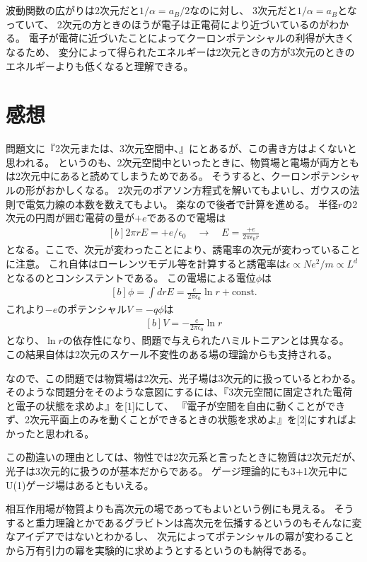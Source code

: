 \documentclass[../ap_2011.tex]{subfiles}
\begin{document}
\section{}
波動関数の広がりは2次元だと\(1/\alpha=a_B/2\)なのに対し、
3次元だと\(1/\alpha=a_B\)となっていて、
2次元の方ときのほうが電子は正電荷により近づいているのがわかる。
電子が電荷に近づいたことによってクーロンポテンシャルの利得が大きくなるため、
変分によって得られたエネルギーは2次元ときの方が3次元のときのエネルギーよりも低くなると理解できる。

\section*{感想}
問題文に『2次元または、3次元空間中、』にとあるが、この書き方はよくないと思われる。
というのも、2次元空間中といったときに、物質場と電場が両方ともは2次元中にあると読めてしまうためである。
そうすると、クーロンポテンシャルの形がおかしくなる。
2次元のポアソン方程式を解いてもよいし、ガウスの法則で電気力線の本数を数えてもよい。
楽なので後者で計算を進める。
半径\(r\)の2次元の円周が囲む電荷の量が\(+e\)であるので電場は
\begin{equation*}\begin{aligned}[b]
    2\pi rE = +e/\epsilon_0\quad\rightarrow\quad E = \frac{+e}{2\pi\epsilon_0 r}
\end{aligned}\end{equation*}
となる。ここで、次元が変わったことにより、誘電率の次元が変わっていることに注意。
これ自体はローレンツモデル等を計算すると誘電率は\(\epsilon\propto Ne^2/m \propto L^d\)となるのとコンシステントである。
この電場による電位\(\phi\)は
\begin{equation*}\begin{aligned}[b]
    \phi = \int dr E = \frac{e}{2\pi\epsilon_0}\ln r +\text{const.}
\end{aligned}\end{equation*}
これより\(-e\)のポテンシャル\(V=-q\phi\)は
\begin{equation*}\begin{aligned}[b]
    V = -\frac{e}{2\pi\epsilon_0}\ln r
\end{aligned}\end{equation*}
となり、\(\ln r\)の依存性になり、問題で与えられたハミルトニアンとは異なる。
この結果自体は2次元のスケール不変性のある場の理論からも支持される。

なので、この問題では物質場は2次元、光子場は3次元的に扱っているとわかる。
そのような問題分をそのような意図にするには、『3次元空間に固定された電荷と電子の状態を求めよ』を[1]にして、
『電子が空間を自由に動くことができず、2次元平面上のみを動くことができるときの状態を求めよ』を[2]にすればよかったと思われる。

この勘違いの理由としては、物性では2次元系と言ったときに物質は2次元だが、
光子は3次元的に扱うのが基本だからである。
ゲージ理論的にも3+1次元中にU(1)ゲージ場はあるともいえる。

相互作用場が物質よりも高次元の場であってもよいという例にも見える。
そうすると重力理論とかであるグラビトンは高次元を伝播するというのもそんなに変なアイデアではないとわかるし、
次元によってポテンシャルの冪が変わることから万有引力の冪を実験的に求めようとするというのも納得である。
\end{document}
